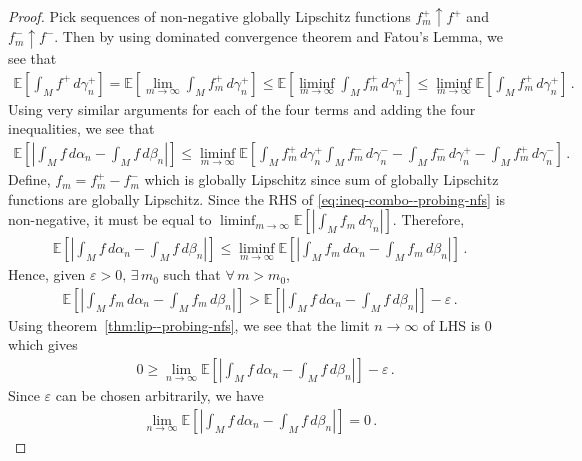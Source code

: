 \begin{cor}
\begin{proof}
Pick sequences of non-negative globally Lipschitz functions $f^+_m\uparrow f^+$ and $f^-_m\uparrow f^-$. Then by using dominated convergence theorem and Fatou's Lemma, we see that
\begin{align}
    \mathbb E\left[\int_M f^+\,d\gamma_n^+\right] = \mathbb E\left[\lim_{m\to\infty}\int_M f^+_m\,d\gamma_n^+\right] \le \mathbb E\left[\liminf_{m\to\infty}\int_M f^+_m\,d\gamma_n^+\right] \le \liminf_{m\to\infty}\mathbb E\left[\int_M f^+_m\,d\gamma_n^+\right] \,.
    \label{eq:ineq1--probing-nfs}
\end{align}
Using very similar arguments for each of the four terms and adding the four inequalities, we see that 
\begin{align}
   \mathbb E\left[\left|\int_M f\,d\alpha_n - \int_M f\,d\beta_n\right|\right] \le \liminf_{m\to\infty}\mathbb E\left[\int_M f^+_m\,d\gamma_n^+\int_M f^-_m\,d\gamma_n^--\int_M f^-_m\,d\gamma_n^+-\int_M f^+_m\,d\gamma_n^-\right] \,. \label{eq:ineq-combo--probing-nfs}
\end{align}
Define, $f_m = f_m^+ - f_m^-$ which is globally Lipschitz since sum of globally Lipschitz functions are globally Lipschitz. Since the RHS of \eqref{eq:ineq-combo--probing-nfs} is non-negative, it must be equal to $\liminf_{m\to\infty}\mathbb E\left[\left|\int_M f_m\,d\gamma_n\right|\right]$. Therefore,
\begin{align}
    \mathbb E\left[\left|\int_M f\,d\alpha_n - \int_M f\,d\beta_n\right|\right]\le\liminf_{m\to\infty}\mathbb E\left[\left|\int_M f_m\,d\alpha_n - \int_M f_m\,d\beta_n\right|\right] \,.
\end{align}
Hence, given $\varepsilon > 0, \,\exists\, m_0$ such that $\forall \, m > m_0$, 
\begin{align}
\mathbb E\left[\left|\int_M f_m\,d\alpha_n - \int_M f_m\,d\beta_n\right|\right] > \mathbb E\left[\left|\int_M f\,d\alpha_n - \int_M f\,d\beta_n\right|\right] - \varepsilon \,.
\end{align}
Using theorem~\ref{thm:lip--probing-nfs}, we see that the limit $n \to \infty$ of LHS is $0$ which gives
\begin{align}
    & 0 \ge \lim_{n\to\infty}\mathbb E\left[\left|\int_M f\,d\alpha_n - \int_M f\,d\beta_n\right|\right] - \varepsilon \,.
\end{align}
Since $\varepsilon$ can be chosen arbitrarily, we have
\begin{align}
    \lim_{n\to\infty}\mathbb E\left[\left|\int_M f\,d\alpha_n - \int_M f\,d\beta_n\right|\right] = 0  \,.
\end{align}
\end{proof}
\label{cor:cts--probing-nfs}
\end{cor}

